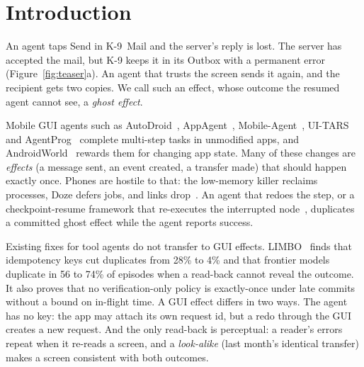 \section{Introduction}
\label{sec:intro}


An agent taps Send in K-9~Mail and the server's reply is lost. The server has accepted the mail, but K-9 keeps it in its Outbox with a permanent error
(Figure~\ref{fig:teaser}a). An agent that trusts the screen sends it again, and the recipient gets two copies.
We call such an effect, whose outcome the resumed agent cannot see, a \emph{ghost effect}.

Mobile GUI agents such as AutoDroid~\cite{wen2024autodroid}, AppAgent~\cite{zhang2025appagent}, Mobile-Agent~\cite{wang2024mobileagent,ye2025mobileagentv3},
UI-TARS~\cite{qin2025uitars} and AgentProg~\cite{tian2025agentprog} complete multi-step tasks in unmodified apps, and
AndroidWorld~\cite{rawles2025androidworld} rewards them for changing app state. Many of these changes are \emph{effects} (a message sent,
an event created, a transfer made) that should happen exactly once. Phones are hostile to that: the low-memory killer reclaims processes, Doze defers jobs, and links
drop~\cite{android_lmkd,android_doze}. An agent that redoes the step, or a checkpoint-resume framework that re-executes the
interrupted node~\cite{khan2026resume,langgraph_durable}, duplicates a committed ghost effect while the agent reports success.

Existing fixes for tool agents do not transfer to GUI effects.
LIMBO~\cite{li2026exactlyonce} finds that idempotency keys cut duplicates from 28\% to 4\% and that frontier models duplicate in 56 to 74\% of episodes when a
read-back cannot reveal the outcome. It also proves that no verification-only policy is exactly-once under late commits without a bound on in-flight time. A GUI effect
differs in two ways. The agent has no key: the app may attach its own request id, but a redo through the GUI creates a new request. And the only read-back is perceptual: a reader's
errors repeat when it re-reads a screen, and a \emph{look-alike} (last month's identical transfer) makes a screen consistent with both outcomes.

